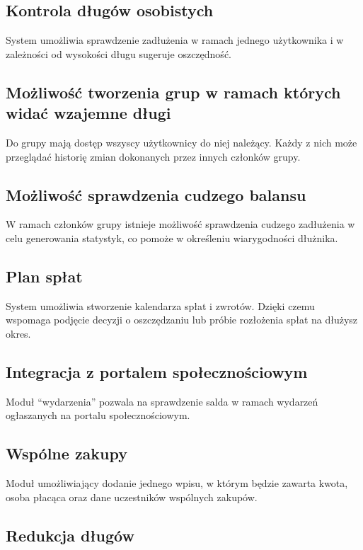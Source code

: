 \documentclass[12pt,a4paper]{article}
\begin{document}
	\subsection{Kontrola długów osobistych}

System umożliwia sprawdzenie zadłużenia w ramach jednego użytkownika i w zależności od wysokości długu sugeruje oszczędność.

	\subsection{Możliwość tworzenia grup w ramach których widać wzajemne długi}

Do grupy mają dostęp wszyscy użytkownicy do niej należący. Każdy z nich może przeglądać historię zmian dokonanych przez innych członków grupy.

	\subsection{Możliwość sprawdzenia cudzego balansu}

W ramach członków grupy istnieje możliwość sprawdzenia cudzego zadłużenia w celu generowania statystyk, co pomoże w określeniu wiarygodności dłużnika.

	\subsection{Plan spłat}

System umożliwia stworzenie kalendarza spłat i zwrotów. Dzięki czemu wspomaga podjęcie decyzji o oszczędzaniu lub próbie rozłożenia spłat na dłużysz okres.

	\subsection{Integracja z portalem społecznościowym}

Moduł “wydarzenia” pozwala na sprawdzenie salda w ramach wydarzeń ogłaszanych na portalu społecznościowym.

	\subsection{Wspólne zakupy}

Moduł umożliwiający dodanie jednego wpisu, w którym będzie zawarta kwota, osoba płacąca oraz dane uczestników wspólnych zakupów.

	\subsection{Redukcja długów}
\end{document}
